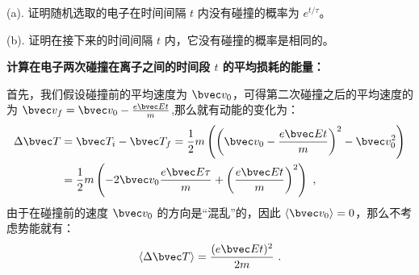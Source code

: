 \begin{example}{}
(a). 证明随机选取的电子在时间间隔 $t$ 内没有碰撞的概率为 $e^{t/\tau}$。

(b). 证明在接下来的时间间隔 $t$ 内，它没有碰撞的概率是相同的。
\end{example}
\begin{example}{}
\textbf{计算在电子两次碰撞在离子之间的时间段 $t$ 的平均损耗的能量：}

首先，我们假设碰撞前的平均速度为 $\bvec v_0$，可得第二次碰撞之后的平均速度的为 $\bvec v_f=\bvec v_0 -\frac{e\bvec E t}{m}$,那么就有动能的变化为：
\begin{align}
\Delta \bvec T &= \bvec T_i-\bvec T_f=\frac{1}{2}m\left(\left(\bvec v_0 -\frac{e\bvec E t}{m}\right)^2-\bvec v_0^2\right)\\
&=\frac{1}{2}m\left(-2\bvec v_0\frac{e\bvec E \tau}{m}+\left(\frac{e\bvec E t}{m}\right)^2\right)~,\\
\end{align}
由于在碰撞前的速度 $\bvec v_0$ 的方向是“混乱”的，因此 $\langle \bvec v_0\rangle = 0$，那么不考虑势能就有：
\begin{equation}
\langle \Delta \bvec T \rangle = \frac{(e\bvec E t)^2}{2m}~.
\end{equation}
\end{example}
